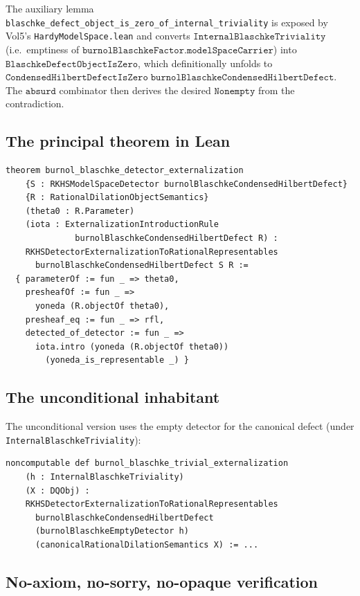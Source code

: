 \documentclass[12pt]{article}
\theoremstyle{plain}
\theoremstyle{definition}
\theoremstyle{remark}
\begin{document}
The auxiliary lemma
\texttt{blaschke\_defect\_object\_is\_zero\_of\_internal\_triviality}
is exposed by Vol5's \texttt{HardyModelSpace.lean} and converts
$\texttt{InternalBlaschkeTriviality}$ (i.e.\ emptiness of
$\texttt{burnolBlaschkeFactor.modelSpaceCarrier}$) into
$\texttt{BlaschkeDefectObjectIsZero}$, which definitionally unfolds
to $\texttt{CondensedHilbertDefectIsZero}\;
\texttt{burnolBlaschkeCondensedHilbertDefect}$.  The
$\texttt{absurd}$ combinator then derives the desired
$\texttt{Nonempty}$ from the contradiction.

\subsection{The principal theorem in Lean}

\begin{verbatim}
theorem burnol_blaschke_detector_externalization
    {S : RKHSModelSpaceDetector burnolBlaschkeCondensedHilbertDefect}
    {R : RationalDilationObjectSemantics}
    (theta0 : R.Parameter)
    (iota : ExternalizationIntroductionRule
              burnolBlaschkeCondensedHilbertDefect R) :
    RKHSDetectorExternalizationToRationalRepresentables
      burnolBlaschkeCondensedHilbertDefect S R :=
  { parameterOf := fun _ => theta0,
    presheafOf := fun _ =>
      yoneda (R.objectOf theta0),
    presheaf_eq := fun _ => rfl,
    detected_of_detector := fun _ =>
      iota.intro (yoneda (R.objectOf theta0))
        (yoneda_is_representable _) }
\end{verbatim}

\subsection{The unconditional inhabitant}

The unconditional version uses the empty detector for the canonical
defect (under \texttt{InternalBlaschkeTriviality}):

\begin{verbatim}
noncomputable def burnol_blaschke_trivial_externalization
    (h : InternalBlaschkeTriviality)
    (X : DQObj) :
    RKHSDetectorExternalizationToRationalRepresentables
      burnolBlaschkeCondensedHilbertDefect
      (burnolBlaschkeEmptyDetector h)
      (canonicalRationalDilationSemantics X) := ...
\end{verbatim}

\subsection{No-axiom, no-sorry, no-opaque verification}
\end{document}
